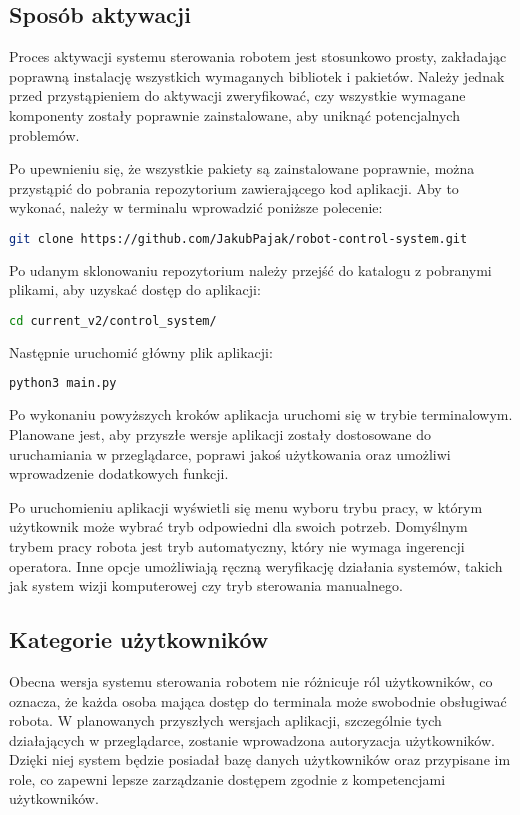 \subsection{Sposób aktywacji}
\label{sekcja:43}
Proces aktywacji systemu sterowania robotem jest stosunkowo prosty, zakładając poprawną instalację wszystkich wymaganych bibliotek i pakietów. Należy jednak przed przystąpieniem do aktywacji zweryfikować, czy wszystkie wymagane komponenty zostały poprawnie zainstalowane, aby uniknąć potencjalnych problemów.

Po upewnieniu się, że wszystkie pakiety są zainstalowane poprawnie, można przystąpić do pobrania repozytorium zawierającego kod aplikacji. Aby to wykonać, należy w terminalu wprowadzić poniższe polecenie:

\begin{lstlisting}[language=bash]
    git clone https://github.com/JakubPajak/robot-control-system.git
\end{lstlisting}

Po udanym sklonowaniu repozytorium należy przejść do katalogu z pobranymi plikami, aby uzyskać dostęp do aplikacji:

\begin{lstlisting}[language=bash]
    cd current_v2/control_system/
\end{lstlisting}

Następnie uruchomić główny plik aplikacji:

\begin{lstlisting}[language=bash]
    python3 main.py
\end{lstlisting}

Po wykonaniu powyższych kroków aplikacja uruchomi się w trybie terminalowym. Planowane jest, aby przyszłe wersje aplikacji zostały dostosowane do uruchamiania w przeglądarce, poprawi jakoś użytkowania oraz umożliwi wprowadzenie dodatkowych funkcji.

Po uruchomieniu aplikacji wyświetli się menu wyboru trybu pracy, w którym użytkownik może wybrać tryb odpowiedni dla swoich potrzeb. Domyślnym trybem pracy robota jest tryb automatyczny, który nie wymaga ingerencji operatora. Inne opcje umożliwiają ręczną weryfikację działania systemów, takich jak system wizji komputerowej czy tryb sterowania manualnego.

\subsection{Kategorie użytkowników}
Obecna wersja systemu sterowania robotem nie różnicuje ról użytkowników, co oznacza, że każda osoba mająca dostęp do terminala może swobodnie obsługiwać robota. W planowanych przyszłych wersjach aplikacji, szczególnie tych działających w przeglądarce, zostanie wprowadzona autoryzacja użytkowników. Dzięki niej system będzie posiadał bazę danych użytkowników oraz przypisane im role, co zapewni lepsze zarządzanie dostępem zgodnie z kompetencjami użytkowników.


